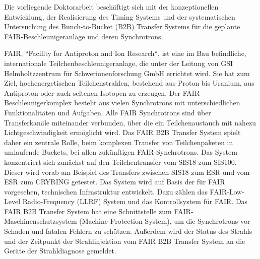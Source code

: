 Die vorliegende Doktorarbeit besch\"aftigt sich mit der konzeptionellen Entwicklung, der Realisierung des Timing Systems und der systematischen Untersuchung des Bunch-to-Bucket (B2B) Transfer Systems f\"ur die geplante FAIR-Beschleunigeranlage und deren Synchrotrons.

FAIR, ``Facility for Antiproton and Ion Research``, ist eine im Bau befindliche, internationale Teilchenbeschleunigeranlage, die unter der Leitung von GSI Helmholtzzentrum f\"ur Schwerionenforschung GmbH errichtet wird. Sie hat zum Ziel, hochenergetischen Teilchenstrahlen, bestehend aus Proton bis Uranium, aus Antiproton oder auch seltenen Isotopen zu erzeugen. Der FAIR-Beschleunigerkomplex besteht aus vielen Synchrotrons mit unterschiedlichen Funktionalit\"aten und Aufgaben. Alle FAIR Synchrotrons
sind \"uber Transferkan\"ale miteinander verbunden, \"uber die ein Teilchenaustauch mit nahezu Lichtgeschwindigkeit erm\"oglicht wird. Das FAIR B2B Transfer System spielt daher ein zentrale Rolle, beim komplexen Transfer von Teilchenpaketen in umlaufende Buckets, bei allen zuk\"unftigen FAIR-Synchrotrons. Das System konzentriert sich zun\"achst auf den Teilchentransfer vom SIS18 zum SIS100. Dieser wird vorab am Beispiel des Transfers zwischen SIS18 zum ESR und vom ESR zum CRYRING getestet. Das System wird auf Basis der f\"ur FAIR
vorgesehen, technischen Infrastruktur entwickelt. Dazu z\"ahlen das FAIR-Low-Level Radio-Frequency (LLRF) System und das Kontrollsystem f\"ur FAIR. Das FAIR B2B Transfer System hat eine Schnittstelle zum FAIR-Maschinenschutzsystem (Machine Protection System), um die Synchrotrons vor Schaden und fatalen Fehlern zu sch\"utzen. Au\ss erdem wird der Status des Strahls und der Zeitpunkt der Strahlinjektion vom FAIR B2B Transfer System an die Ger\"ate der Strahldiagnose gemeldet.


